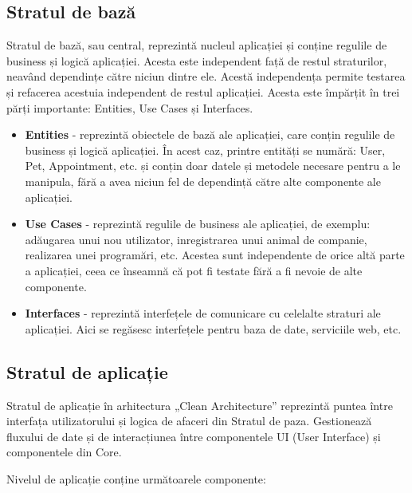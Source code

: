 \newpage

\subsection{Stratul de bază}

Stratul de bază, sau central, reprezintă nucleul aplicației și conține regulile de business și logică aplicației. Acesta este independent față de restul straturilor, neavând dependințe către niciun dintre ele. Acestă independența permite testarea și refacerea acestuia independent de restul aplicației. Acesta este împărțit în trei părți importante: Entities, Use Cases și Interfaces.

\begin{itemize}
    \item \textbf{Entities} - reprezintă obiectele de bază ale aplicației, care conțin regulile de business și logică aplicației. În acest caz, printre entități se numără: User, Pet, Appointment, etc. și conțin doar datele și metodele necesare pentru a le manipula, fără a avea niciun fel de dependință către alte componente ale aplicației.
    \item \textbf{Use Cases} - reprezintă regulile de business ale aplicației, de exemplu: adăugarea unui nou utilizator, inregistrarea unui animal de companie, realizarea unei programări, etc. Acestea sunt independente de orice altă parte a aplicației, ceea ce înseamnă că pot fi testate fără a fi nevoie de alte componente. 
    \item \textbf{Interfaces} - reprezintă interfețele de comunicare cu celelalte straturi ale aplicației. Aici se regăsesc interfețele pentru baza de date, serviciile web, etc.
    
\end{itemize}

\subsection{Stratul de aplicație}

Stratul de aplicație în arhitectura „Clean Architecture” reprezintă puntea între interfața utilizatorului și logica de afaceri din Stratul de paza. Gestionează fluxului de date și de interacțiunea între componentele UI (User Interface) și componentele din Core. 

Nivelul de aplicație conține următoarele componente: 

